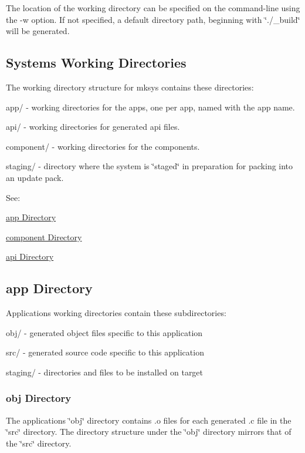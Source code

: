 The location of the working directory can be specified on the command-\/line using the \textquotesingle{}-\/w\textquotesingle{} option. If not specified, a default directory path, beginning with \char`\"{}./\+\_\+build\char`\"{} will be generated.\hypertarget{mkToolsDesign_mkToolsDesign_workingDirs_systems}{}\subsection{Systems\textquotesingle{} Working Directories}\label{mkToolsDesign_mkToolsDesign_workingDirs_systems}
The working directory structure for mksys contains these directories\+:


\begin{DoxyItemize}
\item app/ -\/ working directories for the apps, one per app, named with the app name.
\item api/ -\/ working directories for generated api files.
\item component/ -\/ working directories for the components.
\item staging/ -\/ directory where the system is \char`\"{}staged\char`\"{} in preparation for packing into an update pack.
\end{DoxyItemize}

See\+:
\begin{DoxyItemize}
\item \hyperlink{mkToolsDesign_mkToolsDesign_workingDirs_app}{app Directory}
\item \hyperlink{mkToolsDesign_mkToolsDesign_workingDirs_component}{component Directory}
\item \hyperlink{mkToolsDesign_mkToolsDesign_workingDirs_api}{api Directory}
\end{DoxyItemize}\hypertarget{mkToolsDesign_mkToolsDesign_workingDirs_app}{}\subsection{app Directory}\label{mkToolsDesign_mkToolsDesign_workingDirs_app}
Applications\textquotesingle{} working directories contain these subdirectories\+:


\begin{DoxyItemize}
\item obj/ -\/ generated object files specific to this application
\item src/ -\/ generated source code specific to this application
\item staging/ -\/ directories and files to be installed on target
\end{DoxyItemize}\hypertarget{mkToolsDesign_mkToolsDesign_workingDirs_app_obj}{}\subsubsection{obj Directory}\label{mkToolsDesign_mkToolsDesign_workingDirs_app_obj}
The application\textquotesingle{}s \char`\"{}obj\char`\"{} directory contains .o files for each generated .c file in the \char`\"{}src\char`\"{} directory. The directory structure under the \char`\"{}obj\char`\"{} directory mirrors that of the \char`\"{}src\char`\"{} directory.


